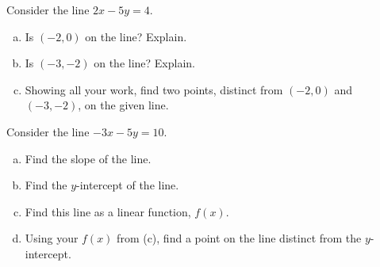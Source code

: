 \documentclass[11pt,letterpaper]{article}
\begin{document}

 Consider the line $2x - 5y= 4$.
	\begin{enumerate}[(a)]
	\item Is $(-2, 0)$ on the line? Explain.
	\item Is $(-3, -2)$ on the line? Explain.
	\item Showing all your work, find two points, distinct from $(-2, 0)$ and $(-3, -2)$, on the given line. 
	\end{enumerate}



\newpage



 Consider the line $-3x - 5y= 10$.
	\begin{enumerate}[(a)]
	\item Find the slope of the line.
	\item Find the $y$-intercept of the line.
	\item Find this line as a linear function, $f(x)$.
	\item Using your $f(x)$ from (c), find a point on the line distinct from the $y$-intercept.
	\end{enumerate}
\end{document}
